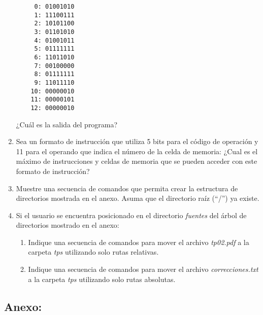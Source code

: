 \documentclass[12pt]{article}
\begin{document}
\begin{enumerate}
        \begin{verbatim}
     0: 01001010
     1: 11100111
     2: 10101100
     3: 01101010
     4: 01001011
     5: 01111111
     6: 11011010
     7: 00100000
     8: 01111111
     9: 11011110
    10: 00000010
    11: 00000101
    12: 00000010
        \end{verbatim}

        ¿Cuál es la salida del programa?

    \item Sea un formato de instrucción que utiliza 5 bits para el código de
        operación y 11 para el operando que indica el número de la celda de
        memoria: ¿Cual es el máximo de instrucciones y celdas de memoria que
        se pueden acceder con este formato de instrucción?

    \item Muestre una secuencia de comandos que permita crear la estructura de
        directorios mostrada en el anexo. Asuma que el
        directorio raíz (``/'') ya existe.

    \item Si el usuario se encuentra posicionado en el directorio
        \emph{fuentes} del árbol de directorios mostrado en el anexo:

        \begin{enumerate}

            \item Indique una secuencia de comandos para mover el archivo
                \emph{tp02.pdf} a la carpeta \emph{tps} utilizando solo rutas
                relativas.

            \item Indique una secuencia de comandos para mover el archivo
                \emph{correcciones.txt} a la carpeta \emph{tps} utilizando
                solo rutas absolutas.

        \end{enumerate}

\end{enumerate}

\subsection*{ \large\textbf{Anexo:} }
\end{document}
